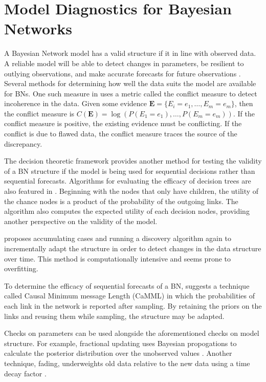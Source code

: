 \documentclass[12pt]{article}
\begin{document}
\section{Model Diagnostics for Bayesian Networks}

A Bayesian Network model has a valid structure if it in line with observed data. A reliable model will be able to detect changes in parameters, be resilient to outlying observations, and make accurate forecasts for future observations \cite{Dawid1984}. 
Several methods for determining how well the data suits the model are available for BNs. One such measure in \cite{KORB} uses a metric called the conflict measure to detect incoherence in the data. Given some evidence $\bm{E}=\{E_i=e_1,\ldots,E_m=e_m\}$, then the conflict measure is $C(\bm{E})=\log(P(E_1=e_1),\ldots,P(E_m=e_m))$. If the conflict measure is positive, the existing evidence must be conflicting. If the conflict is due to flawed data, the conflict measure traces the source of the discrepancy. 

The decision theoretic framework provides another method for testing the validity of a BN structure if the model is being used for sequential decisions rather than sequential forecasts. Algorithms for evaluating the efficacy of decision trees are also featured in \cite{KORB}. Beginning with the nodes that only have children, the utility of the chance nodes is a product of the probability of the outgoing links. The algorithm also computes the expected utility of each decision nodes, providing another perspective on the validity of the model.

\cite{JENSEN} proposes accumulating cases and running a discovery algorithm again to incrementally adapt the structure in order to detect changes in the data structure over time. This method is computationally intensive and seems prone to overfitting. 

To determine the efficacy of sequential forecasts of a BN, \cite{KORB}  suggests a technique called Causal Minimum message Length (CaMML) in which the probabilities of each link in the network is reported after sampling. By retaining the priors on the links and reusing them while sampling, the structure may be adapted. 

Checks on parameters can be used alongside the aforementioned checks on model structure. For example, fractional updating uses Bayesian propogations to calculate the posterior distribution over the unobserved values \cite{Spiegelhalter and Lauritzen}.  Another technique, fading, underweights old data relative to the new data using a time decay factor \cite{JENSEN}. 
\end{document}
